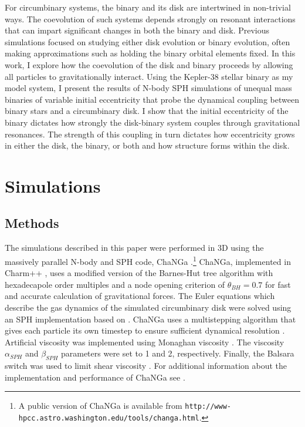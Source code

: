 For circumbinary systems, the binary and its disk are intertwined in
non-trivial ways.  The coevolution of such systems depends strongly on
resonant interactions that can impart significant changes in both the
binary and disk.  Previous simulations focused on studying either disk evolution or binary evolution, often making approximations
such as holding the binary orbital elements fixed.  In this work, I explore how the coevolution
of the disk and binary proceeds by allowing all particles to gravitationally interact.  
Using the Kepler-38 stellar binary as my model system, I present the results of N-body
SPH simulations of unequal mass binaries of variable initial eccentricity 
that probe the dynamical coupling between binary stars and a circumbinary disk.  
I show that the initial eccentricity of the binary dictates how strongly the disk-binary system couples through gravitational resonances.
The strength of this coupling in turn dictates how eccentricity grows in either the disk, the binary, or both and how structure 
forms within the disk.

\section{Simulations}

\subsection{Methods} \label{CBDisk:sec:methods_section}

The simulations described in this paper were performed in 3D using the massively parallel N-body 
and SPH code, ChaNGa
\citep{Menon2015}.\footnote{A public version of ChaNGa is available
  from {\tt http://www-hpcc.astro.washington.edu/tools/changa.html}.}
ChaNGa, implemented in Charm++ \citep{Kale1996}, uses a modified version of the Barnes-Hut tree algorithm with hexadecapole 
order multiples and a node opening criterion of $\theta_{BH} =
  0.7$ for fast and accurate calculation of gravitational forces.  The Euler equations which describe
the gas dynamics of the simulated circumbinary disk were solved using an SPH implementation based on
\citet{Wadsley2004}.  ChaNGa uses a multistepping algorithm that gives
each particle its own timestep to ensure sufficient dynamical
resolution \citep{Quinn1997}.  Artificial viscosity was implemented using
Monaghan viscosity \citep{Monaghan1983}.  The viscosity $\alpha_{SPH}$
  and $\beta_{SPH}$ parameters were set to 1 and 2, respectively.  Finally, the Balsara switch was used to limit shear viscosity \citep{Balsara1995}.  For additional information about the implementation and performance of ChaNGa see \citet{Jetley2008}.

